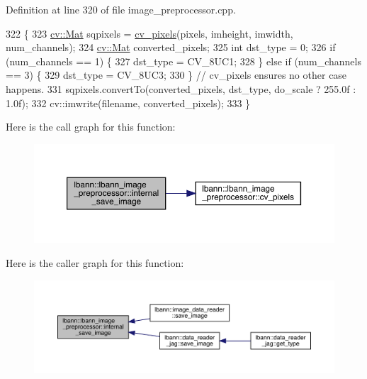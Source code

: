 Definition at line 320 of file image\+\_\+preprocessor.\+cpp.


\begin{DoxyCode}
322                                         \{
323   \hyperlink{base_8hpp_a68f11fdc31b62516cb310831bbe54d73}{cv::Mat} sqpixels = \hyperlink{classlbann_1_1lbann__image__preprocessor_a7dc609e33febdc7fc29bdc9270594bea}{cv\_pixels}(pixels, imheight, imwidth, num\_channels);
324   \hyperlink{base_8hpp_a68f11fdc31b62516cb310831bbe54d73}{cv::Mat} converted\_pixels;
325   \textcolor{keywordtype}{int} dst\_type = 0;
326   \textcolor{keywordflow}{if} (num\_channels == 1) \{
327     dst\_type = CV\_8UC1;
328   \} \textcolor{keywordflow}{else} \textcolor{keywordflow}{if} (num\_channels == 3) \{
329     dst\_type = CV\_8UC3;
330   \}  \textcolor{comment}{// cv\_pixels ensures no other case happens.}
331   sqpixels.convertTo(converted\_pixels, dst\_type, do\_scale ? 255.0f : 1.0f);
332   cv::imwrite(filename, converted\_pixels);
333 \}
\end{DoxyCode}
Here is the call graph for this function\+:\nopagebreak
\begin{figure}[H]
\begin{center}
\leavevmode
\includegraphics[width=350pt]{classlbann_1_1lbann__image__preprocessor_a3c4f4cc5c90233696566a35a62a1708c_cgraph}
\end{center}
\end{figure}
Here is the caller graph for this function\+:\nopagebreak
\begin{figure}[H]
\begin{center}
\leavevmode
\includegraphics[width=350pt]{classlbann_1_1lbann__image__preprocessor_a3c4f4cc5c90233696566a35a62a1708c_icgraph}
\end{center}
\end{figure}
\mbox{\label{classlbann_1_1lbann__image__preprocessor_ab499dd9f11d98998b5902d639f70fa8e}} 
